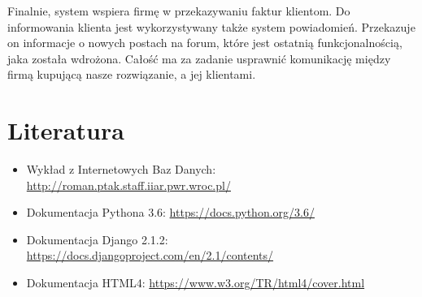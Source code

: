 \documentclass[12pt]{article}
\begin{document}
Finalnie, system wspiera firmę w przekazywaniu faktur klientom. Do informowania klienta jest wykorzystywany także system powiadomień. Przekazuje on informacje o nowych postach na forum, które jest ostatnią funkcjonalnością, jaka została wdrożona. Całość ma za zadanie usprawnić komunikację między firmą kupującą nasze rozwiązanie, a jej klientami.

\section{Literatura}
\begin{itemize}
	\item Wykład z Internetowych Baz Danych: \url{http://roman.ptak.staff.iiar.pwr.wroc.pl/}
	\item Dokumentacja Pythona 3.6: \url{https://docs.python.org/3.6/}
	\item Dokumentacja Django 2.1.2: \url{https://docs.djangoproject.com/en/2.1/contents/}
	\item Dokumentacja HTML4: \url{https://www.w3.org/TR/html4/cover.html}
\end{itemize}
\end{document}
